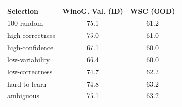 \begin{tabular}{lcc}
Selection & WinoG. Val. (ID) & WSC (OOD) \\
\hline
100%
random & 75.1 & 61.2 \\
high-correctness & 75.0 & 61.0 \\
high-confidence & 67.1 & 60.0 \\
low-variability & 66.4 & 60.0 \\
low-correctness & 74.7 & 62.2 \\
hard-to-learn & 74.8 & 63.2 \\
ambiguous & 75.1 & 63.2 \\
\end{tabular}
